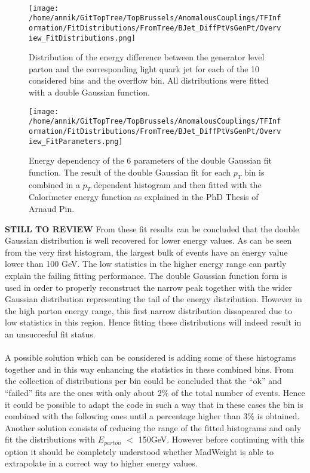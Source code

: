 \\
\begin{figure}[!h]
  \centering
  \texttt{[image: /home/annik/GitTopTree/TopBrussels/AnomalousCouplings/TFInformation/FitDistributions/FromTree/BJet\_DiffPtVsGenPt/Overview\_FitDistributions.png]}
  \caption{Distribution of the energy difference between the generator level parton and the corresponding light quark jet for each of the 10 considered bins and the overflow bin. All distributions were fitted with a double Gaussian function.} \label{fig::StackedHistoBJetPt}
\end{figure}

\begin{figure}[!h]
  \centering
  \texttt{[image: /home/annik/GitTopTree/TopBrussels/AnomalousCouplings/TFInformation/FitDistributions/FromTree/BJet\_DiffPtVsGenPt/Overview\_FitParameters.png]}
  \caption{Energy dependency of the 6 parameters of the double Gaussian fit function. The result of the double Gaussian fit for each $p_T$ bin is combined in a $p_T$ dependent histogram and then fitted with the Calorimeter energy function as explained in the PhD Thesis of Arnaud Pin.} \label{fig::FitParamsBJetPt}
\end{figure}

\newpage
\textbf{STILL TO REVIEW}
\newpage
From these fit results can be concluded that the double Gaussian distribution is well recovered for lower energy values. As can be seen from the very first histogram, the largest bulk of events have an energy value lower than 100 GeV. The low statistics in the higher energy range can partly explain the failing fitting performance. The double Gaussian function form is used in order to properly reconstruct the narrow peak together with the wider Gaussian distribution representing the tail of the energy distribution. However in the high parton energy range, this first narrow distribution dissapeared due to low statistics in this region. Hence fitting these distributions will indeed result in an unsuccesful fit status.\\
\\
A possible solution which can be considered is adding some of these histograms together and in this way enhancing the statistics in these combined bins. From the collection of distributions per bin could be concluded that the ``ok'' and ``failed'' fits are the ones with only about 2$\%$ of the total number of events. Hence it could be possible to adapt the code in such a way that in these cases the bin is combined with the following ones until a percentage higher than 3$\%$ is obtained.\\
Another solution consists of reducing the range of the fitted histograms and only fit the distributions with $E_{parton}$ $<$ 150GeV. However before continuing with this option it should be completely understood whether MadWeight is able to extrapolate in a correct way to higher energy values.

